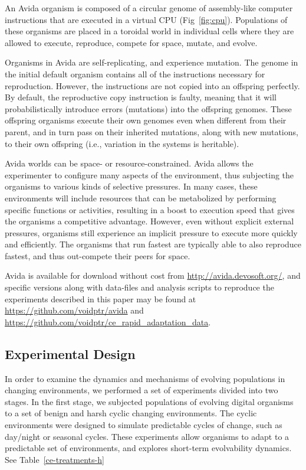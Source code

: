 \documentclass[10pt,letterpaper,final]{article}
\begin{document}
An Avida organism is composed of a circular genome of assembly-like computer instructions that are executed in a virtual CPU (Fig~\ref{fig:cpu}). Populations of these organisms are placed in a toroidal world in individual cells where they are allowed to execute, reproduce, compete for space, mutate, and evolve.

Organisms in Avida are self-replicating, and experience mutation. The genome in the initial default organism contains all of the instructions necessary for reproduction. However, the instructions are not copied into an offspring perfectly. By default, the reproductive copy instruction is faulty, meaning that it will probabilistically introduce errors (mutations) into the offspring genomes. These offspring organisms execute their own genomes even when different from their parent, and in turn pass on their inherited mutations, along with new mutations, to their own offspring (i.e., variation in the systems is heritable).

Avida worlds can be space- or resource-constrained. Avida allows the experimenter to configure many aspects of the environment, thus subjecting the organisms to various kinds of selective pressures.  In many cases, these environments will include resources that can be metabolized by performing specific functions or activities, resulting in a boost to execution speed that gives the organisms a competitive advantage. However, even without explicit external pressures, organisms still experience an implicit pressure to execute more quickly and efficiently. The organisms that run fastest are typically able to also reproduce fastest, and thus out-compete their peers for space.

Avida is available for download without cost from \url{http://avida.devosoft.org/}, and specific versions along with data-files and analysis scripts to reproduce the experiments described in this paper may be found at \url{https://github.com/voidptr/avida} and \url{https://github.com/voidptr/ce_rapid_adaptation_data}.

\subsection*{Experimental Design}
In order to examine the dynamics and mechanisms of evolving populations in changing environments, we performed a set of experiments divided into two stages. In the first stage, we subjected populations of evolving digital organisms to a set of benign and harsh cyclic changing environments. The cyclic environments were designed to simulate predictable cycles of change, such as day/night or seasonal cycles. These experiments allow organisms to adapt to a predictable set of environments, and explores short-term evolvability dynamics. See Table~\ref{ce-treatments-h}
\end{document}
